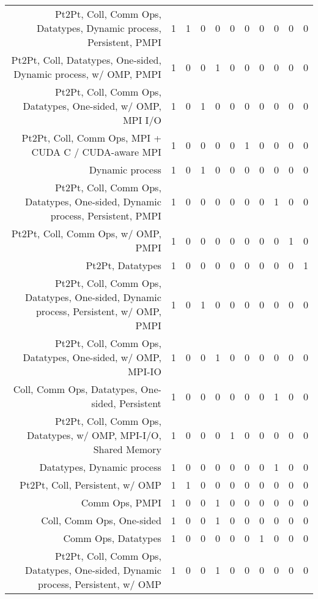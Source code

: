 {\begin{landscape}
\begin{longtable}[htb]{r|c|c|c|c|c|c|c|c|c|c}
{Pt2Pt, Coll, Comm Ops, Datatypes, Dynamic process, Persistent, PMPI} & 1 & 1 & 0 & 0 & 0 & 0 & 0 & 0 & 0 & 0 \\%
{Pt2Pt, Coll, Datatypes, One-sided, Dynamic process, w/ OMP, PMPI} & 1 & 0 & 0 & 1 & 0 & 0 & 0 & 0 & 0 & 0 \\%
{Pt2Pt, Coll, Comm Ops, Datatypes, One-sided, w/ OMP, MPI I/O} & 1 & 0 & 1 & 0 & 0 & 0 & 0 & 0 & 0 & 0 \\%
{Pt2Pt, Coll, Comm Ops, MPI + CUDA C / CUDA-aware MPI} & 1 & 0 & 0 & 0 & 0 & 1 & 0 & 0 & 0 & 0 \\%
{Dynamic process} & 1 & 0 & 1 & 0 & 0 & 0 & 0 & 0 & 0 & 0 \\%
{Pt2Pt, Coll, Comm Ops, Datatypes, One-sided, Dynamic process, Persistent, PMPI} & 1 & 0 & 0 & 0 & 0 & 0 & 0 & 1 & 0 & 0 \\%
{Pt2Pt, Coll, Comm Ops, w/ OMP, PMPI} & 1 & 0 & 0 & 0 & 0 & 0 & 0 & 0 & 1 & 0 \\%
{Pt2Pt, Datatypes} & 1 & 0 & 0 & 0 & 0 & 0 & 0 & 0 & 0 & 1 \\%
{Pt2Pt, Coll, Comm Ops, Datatypes, One-sided, Dynamic process, Persistent, w/ OMP, PMPI} & 1 & 0 & 1 & 0 & 0 & 0 & 0 & 0 & 0 & 0 \\%
{Pt2Pt, Coll, Comm Ops, Datatypes, One-sided, w/ OMP, MPI-IO} & 1 & 0 & 0 & 1 & 0 & 0 & 0 & 0 & 0 & 0 \\%
{Coll, Comm Ops, Datatypes, One-sided, Persistent} & 1 & 0 & 0 & 0 & 0 & 0 & 0 & 1 & 0 & 0 \\%
{Pt2Pt, Coll, Comm Ops, Datatypes, w/ OMP, MPI-I/O, Shared Memory} & 1 & 0 & 0 & 0 & 1 & 0 & 0 & 0 & 0 & 0 \\%
{Datatypes, Dynamic process} & 1 & 0 & 0 & 0 & 0 & 0 & 0 & 1 & 0 & 0 \\%
{Pt2Pt, Coll, Persistent, w/ OMP} & 1 & 1 & 0 & 0 & 0 & 0 & 0 & 0 & 0 & 0 \\%
{Comm Ops, PMPI} & 1 & 0 & 0 & 1 & 0 & 0 & 0 & 0 & 0 & 0 \\%
{Coll, Comm Ops, One-sided} & 1 & 0 & 0 & 1 & 0 & 0 & 0 & 0 & 0 & 0 \\%
{Comm Ops, Datatypes} & 1 & 0 & 0 & 0 & 0 & 0 & 1 & 0 & 0 & 0 \\%
{Pt2Pt, Coll, Comm Ops, Datatypes, One-sided, Dynamic process, Persistent, w/ OMP} & 1 & 0 & 0 & 1 & 0 & 0 & 0 & 0 & 0 & 0 \\%
\hline%
\end{longtable}%
\end{landscape}}%
\clearpage%
